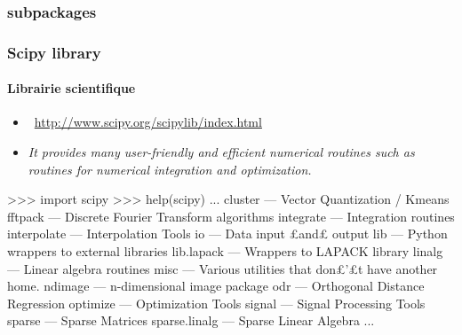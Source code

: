 \subsubsection{subpackages}
\begin{frame}[fragile]
\frametitle{Scipy library}
\framesubtitle{Librairie scientifique}
\begin{itemize}
 \item {} \, \url{http://www.scipy.org/scipylib/index.html}
 \item \emph{It provides many user-friendly and efficient numerical routines such as routines for numerical integration and optimization.}
\end{itemize}
\begin{pythonConsole}
>>> import scipy
>>> help(scipy)
	...
     cluster                      --- Vector Quantization / Kmeans
     fftpack                      --- Discrete Fourier Transform algorithms
     integrate                    --- Integration routines
     interpolate                  --- Interpolation Tools
     io                           --- Data input £and£ output
     lib                          --- Python wrappers to external libraries
     lib.lapack                   --- Wrappers to LAPACK library
     linalg                       --- Linear algebra routines
     misc                         --- Various utilities that don£'£t have
                                      another home.
     ndimage                      --- n-dimensional image package
     odr                          --- Orthogonal Distance Regression
     optimize                     --- Optimization Tools
     signal                       --- Signal Processing Tools
     sparse                       --- Sparse Matrices
     sparse.linalg                --- Sparse Linear Algebra
    ...
\end{pythonConsole}
\end{frame}
